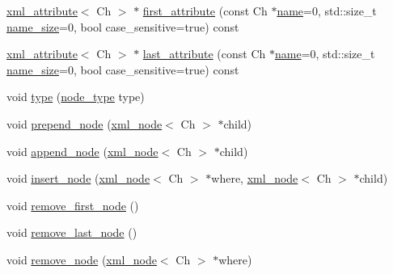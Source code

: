 \begin{DoxyCompactItemize}
\item 
\hyperlink{classrapidxml_1_1xml__attribute}{xml\+\_\+attribute}$<$ Ch $>$ $\ast$ \hyperlink{classrapidxml_1_1xml__node_ae426802be58114ffc41bf30ac6b8c37d}{first\+\_\+attribute} (const Ch $\ast$\hyperlink{classrapidxml_1_1xml__base_a9a09739310469995db078ebd0da3ed45}{name}=0, std\+::size\+\_\+t \hyperlink{classrapidxml_1_1xml__base_a7e7f98b3d01e1eab8dc1ca69aad9af84}{name\+\_\+size}=0, bool case\+\_\+sensitive=true) const 
\item 
\hyperlink{classrapidxml_1_1xml__attribute}{xml\+\_\+attribute}$<$ Ch $>$ $\ast$ \hyperlink{classrapidxml_1_1xml__node_a50c03f2db3fa51f27a73d86ec29a49d3}{last\+\_\+attribute} (const Ch $\ast$\hyperlink{classrapidxml_1_1xml__base_a9a09739310469995db078ebd0da3ed45}{name}=0, std\+::size\+\_\+t \hyperlink{classrapidxml_1_1xml__base_a7e7f98b3d01e1eab8dc1ca69aad9af84}{name\+\_\+size}=0, bool case\+\_\+sensitive=true) const 
\item 
void \hyperlink{classrapidxml_1_1xml__node_a499bbc9300c1b06821d5c08b24164c68}{type} (\hyperlink{rapidxml_8hpp_abb456db38f7efb746c4330eed6072a7c}{node\+\_\+type} type)
\item 
void \hyperlink{classrapidxml_1_1xml__node_ae86e92908c3eab40bbed8216e4f3f3cb}{prepend\+\_\+node} (\hyperlink{classrapidxml_1_1xml__node}{xml\+\_\+node}$<$ Ch $>$ $\ast$child)
\item 
void \hyperlink{classrapidxml_1_1xml__node_a8696d098ecc9c4d2a646b43e91d58e31}{append\+\_\+node} (\hyperlink{classrapidxml_1_1xml__node}{xml\+\_\+node}$<$ Ch $>$ $\ast$child)
\item 
void \hyperlink{classrapidxml_1_1xml__node_a666880f42a7e486d78cc45ed51c7c46d}{insert\+\_\+node} (\hyperlink{classrapidxml_1_1xml__node}{xml\+\_\+node}$<$ Ch $>$ $\ast$where, \hyperlink{classrapidxml_1_1xml__node}{xml\+\_\+node}$<$ Ch $>$ $\ast$child)
\item 
void \hyperlink{classrapidxml_1_1xml__node_a62bf7b276cf7a651a3337f5e0a0ef6ac}{remove\+\_\+first\+\_\+node} ()
\item 
void \hyperlink{classrapidxml_1_1xml__node_a9182512e948ec451a83f116cce7c7674}{remove\+\_\+last\+\_\+node} ()
\item 
void \hyperlink{classrapidxml_1_1xml__node_a98289923eb9e8889418a9eb0207ea35c}{remove\+\_\+node} (\hyperlink{classrapidxml_1_1xml__node}{xml\+\_\+node}$<$ Ch $>$ $\ast$where)\hypertarget{classrapidxml_1_1xml__node_a98289923eb9e8889418a9eb0207ea35c}{}\label{classrapidxml_1_1xml__node_a98289923eb9e8889418a9eb0207ea35c}


\end{DoxyCompactItemize}
